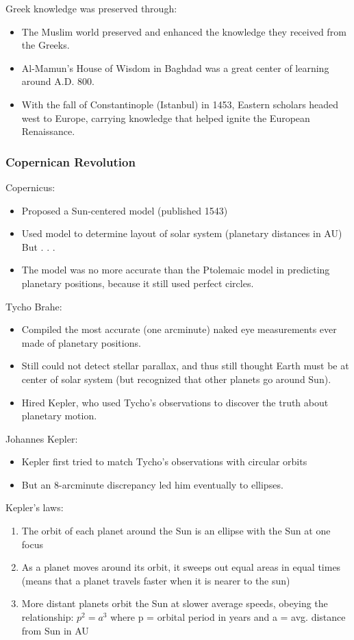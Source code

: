 Greek knowledge was preserved through:
\begin{itemize}
\item The Muslim world preserved and enhanced the knowledge they received from the Greeks.
\item Al-Mamun's House of Wisdom in Baghdad was a great center of learning around A.D. 800.
\item With the fall of Constantinople (Istanbul) in 1453, Eastern scholars headed west to Europe, carrying knowledge that helped ignite the European Renaissance.
\end{itemize}

\subsubsection{Copernican Revolution}
Copernicus:
\begin{itemize}
\item Proposed a Sun-centered model (published 1543)
\item Used model to determine layout of solar system (planetary distances in AU) But . . .
\item The model was no more accurate than the Ptolemaic model in predicting planetary positions, because it still used perfect circles.
\end{itemize}
Tycho Brahe:
\begin{itemize}
\item Compiled the most accurate (one arcminute) naked eye measurements ever made of planetary positions.
\item Still could not detect stellar parallax, and thus still thought Earth must be at center of solar system (but recognized that other planets go around Sun).
\item Hired Kepler, who used Tycho's observations to discover the truth about planetary motion.
\end{itemize}
Johannes Kepler:
\begin{itemize}
\item Kepler first tried to match Tycho's observations with circular orbits
\item But an 8-arcminute discrepancy led him eventually to ellipses.
\end{itemize}
Kepler's laws:
\begin{enumerate}
\item The orbit of each planet around the Sun is an ellipse with the Sun at one focus
\item As a planet moves around its orbit, it sweeps out equal areas in equal times  (means that a planet travels faster when it is nearer to the sun)
\item More distant planets orbit the Sun at slower average speeds, obeying the relationship: $p^2 = a^3$ where p = orbital period in years and a = avg. distance from Sun in AU
\end{enumerate}
